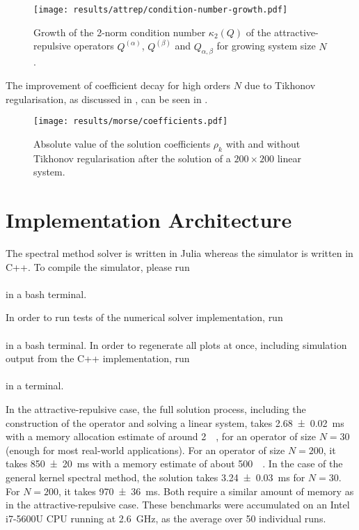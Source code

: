 \begin{figure}[H]
  \centering
  \texttt{[image: results/attrep/condition-number-growth.pdf]}
  \caption[Growth of the condition number]{Growth of the 2-norm condition number $\kappa_2(Q)$ of the attractive-repulsive operators $Q^{(\alpha)}$, $Q^{(\beta)}$ and $Q_{\alpha,\beta}$ for growing system size $N$.}
  \label{fig:condition-number-growth}
\end{figure}

The improvement of coefficient decay for high orders $N$ due to Tikhonov regularisation, as discussed in , can be seen in .

\begin{figure}[H]
  \centering
  \texttt{[image: results/morse/coefficients.pdf]}
  \caption[Absolute value of the coefficients with and without regularisation]{Absolute value of the solution coefficients $\rho_k$ with and without Tikhonov regularisation after the solution of a $200 \times 200$ linear system.}
  \label{fig:coefficients}
\end{figure}

\section{Implementation Architecture}
The spectral method solver is written in Julia \parencite{2017-julia} whereas the simulator is written in C++.
To compile the simulator, please run \\
 \\
in a bash terminal.

In order to run tests of the numerical solver implementation, run \\
 \\
in a bash terminal. In order to regenerate all plots at once, including simulation output from the C++ implementation, run \\
 \\
in a terminal.

In the attractive-repulsive case, the full solution process, including the construction of the operator and solving a linear system, takes \SI{2.68 \pm 0.02}{\milli\second} with a memory allocation estimate of around \SI{2}{\mega\byte}, for an operator of size $N=30$ (enough for most real-world applications).
For an operator of size $N = 200$, it takes \SI{850 \pm 20}{\milli\second} with a memory estimate of about \SI{500}{\mega\beta}.
In the case of the general kernel spectral method, the solution takes \SI{3.24 \pm 0.03}{\milli\second} for $N=30$.
For $N=200$, it takes \SI{970 \pm 36}{\milli\second}.
Both require a similar amount of memory as in the attractive-repulsive case.
These benchmarks were accumulated on an Intel \textregistered \, i7-5600U CPU running at \SI{2.6}{\giga\hertz}, as the average over 50 individual runs.
